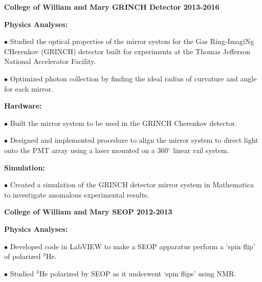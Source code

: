 \documentclass[letterpaper,10pt]{article}
\renewenvironment{itemize}{
  \begin{list}{}{
    \setlength{\leftmargin}{1.5em}
  }
}{
  \end{list}
}
\begin{document}
{\begin{itemize}
\item {\large {\bf College of William and Mary GRINCH Detector 2013-2016} }
 \begin{itemize}\itemsep5pt \parskip0pt 
  \item \textbf{Physics Analyses:}
   
    \begin{itemize}\itemsep5pt \parskip0pt 
     \item $\bullet$ Studied the optical properties of the mirror system for the Gas Ring-ImagiNg CHerenkov (GRINCH) detector built for experiments at the Thomas Jefferson National Accelerator Facility. 
     \item $\bullet$ Optimized photon collection by finding the ideal radius of curvature and angle for each mirror.
     \end{itemize}

  \item \textbf{Hardware:}
    \begin{itemize}\itemsep5pt \parskip0pt 
     \item $\bullet$ Built the mirror system to be used in the GRINCH Cherenkov detector.
     \item $\bullet$ Designed and implemented procedure to align the mirror system to direct light onto the PMT array using a laser mounted on a 360$^\circ$ linear rail system.
    \end{itemize}
    
   \item \textbf{Simulation:}
     \begin{itemize}\itemsep5pt \parskip0pt 
      \item $\bullet$ Created a simulation of the GRINCH detector mirror system in Mathematica to investigate anomalous experimental results.
     \end{itemize} 
 
\end{itemize}

\vspace{3mm}

\item {\large {\bf College of William and Mary SEOP 2012-2013} }
 \begin{itemize}\itemsep5pt \parskip0pt 
  \item \textbf{Physics Analyses:}
   
    \begin{itemize}\itemsep5pt
     \item $\bullet$ Developed code in LabVIEW to make a SEOP apparatus perform a `spin flip' of polarized $^{3}$He.
     \item $\bullet$ Studied $^{3}$He polarized by SEOP as it underwent `spin flips' using NMR.
     \end{itemize}


\end{itemize}
\end{itemize}}
\end{document}
